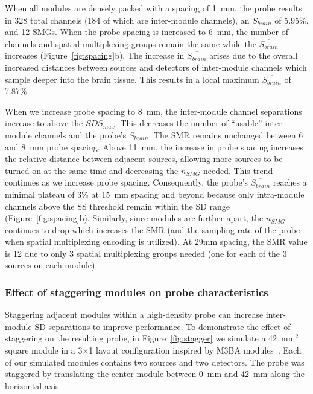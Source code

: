 When all modules are densely packed with a spacing of 1~mm, the probe results in 328 total channels (184 of which are inter-module channels), an $\overline{S_{brain}}$ of 5.95\%, and 12 \ac{SMG}s. When the probe spacing is increased to 6~mm, the number of channels and spatial multiplexing groups remain the same while the $\overline{S_{brain}}$ increases (Figure~\ref{fig:spacing}b). The increase in $\overline{S_{brain}}$ arises due to the overall increased distances between sources and detectors of inter-module channels which sample deeper into the brain tissue. This results in a local maximum $\overline{S_{brain}}$ of 7.87\%. 

When we increase probe spacing to 8~mm, the inter-module channel separations increase to above the $SDS_{max}$. This decreases the number of ``usable'' inter-module channels and the probe's $\overline{S_{brain}}$. The \ac{SMR} remains unchanged between 6 and 8~mm probe spacing. Above 11~mm, the increase in probe spacing increases the relative distance between adjacent sources, allowing more sources to be turned on at the same time and decreasing the $n_{SMG}$ needed. This trend continues as we increase probe spacing. Consequently, the probe's $\overline{S_{brain}}$ reaches a minimal plateau of 3\% at 15~mm spacing and beyond because only intra-module channels above the \ac{SS} threshold remain within the \ac{SD} range (Figure~\ref{fig:spacing}b). Similarly, since modules are further apart, the $n_{SMG}$ continues to drop which increases the \ac{SMR} (and the sampling rate of the probe when spatial multiplexing encoding is utilized). At 29mm spacing, the \ac{SMR} value is 12 due to only 3 spatial multiplexing groups needed (one for each of the 3 sources on each module).

\subsubsection{Effect of staggering modules on probe characteristics}
Staggering adjacent modules within a high-density probe can increase inter-module \ac{SD} separations to improve performance. To demonstrate the effect of staggering on the resulting probe, in Figure~\ref{fig:stagger} we simulate a 42~$\textrm{mm}^2$ square module in a 3$\times$1 layout configuration inspired by M3BA modules~\cite{Bci2017}. Each of our simulated modules contains two sources and two detectors. The probe was staggered by translating the center module between 0~mm and 42~mm along the horizontal axis.

